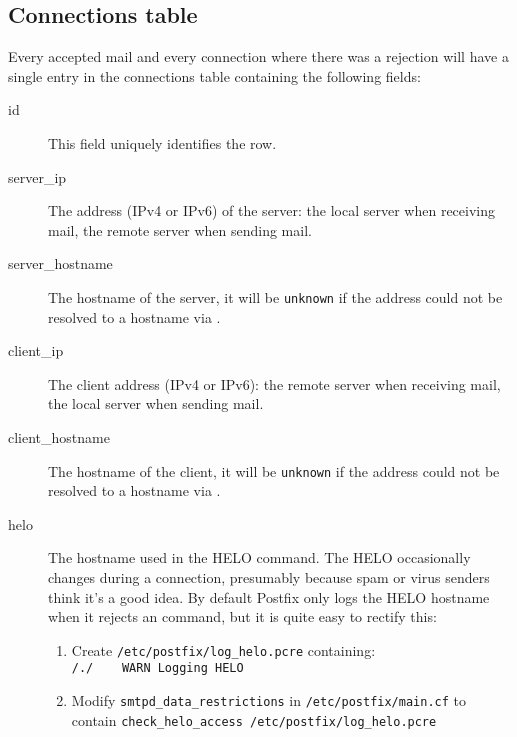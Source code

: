 \documentclass[a4paper,12pt,draft]{article}
\newcommand{\tab}[0]{%
    \hspace*{2em}%
}
\begin{document}
\subsection{Connections table}

\label{connections table}

Every accepted mail and every connection where there was a rejection will
have a single entry in the connections table containing the following
fields:

\begin{description}

    \item [id] This field uniquely identifies the row.

    \item [server\_ip] The \IP{} address (IPv4 or IPv6) of the server: the
        local server when receiving mail, the remote server when sending
        mail.

    \item [server\_hostname] The hostname of the server, it will be
        \texttt{unknown} if the \IP{} address could not be resolved to a
        hostname via \DNS{}\@.

    \item [client\_ip] The client \IP{} address (IPv4 or IPv6): the remote
        server when receiving mail, the local server when sending mail.

    \item [client\_hostname] The hostname of the client, it will be
        \texttt{unknown} if the \IP{} address could not be resolved to a
        hostname via \DNS{}\@.

    \item [helo] The hostname used in the HELO command.  The HELO
        occasionally changes during a connection, presumably because spam
        or virus senders think it's a good idea.  By default Postfix only
        logs the HELO hostname when it rejects an \SMTP{} command, but it
        is quite easy to rectify this:

\label{logging helo}

        \begin{enumerate}

            \item Create \texttt{/etc/postfix/log\_helo.pcre}
                containing:\newline \tab{}\texttt{/./~~~~WARN~Logging~HELO}

            \item Modify \texttt{smtpd\_data\_restrictions} in
                \texttt{/etc/postfix/main.cf} to contain\newline
                \tab{}\texttt{check\_helo\_access~/etc/postfix/log\_helo.pcre}


\end{enumerate}
\end{description}
\end{document}

